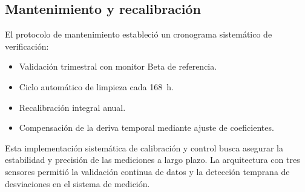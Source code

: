 \subsection{Mantenimiento y recalibración}
El protocolo de mantenimiento estableció un cronograma sistemático de verificación:
\begin{itemize}
	\item Validación trimestral con monitor Beta de referencia.
	\item Ciclo automático de limpieza cada \SI{168}{\hour}.
	\item Recalibración integral anual.
	\item Compensación de la deriva temporal mediante ajuste de coeficientes.
\end{itemize}

Esta implementación sistemática de calibración y control busca asegurar la estabilidad y precisión de las mediciones a largo plazo. La arquitectura con tres sensores permitió la validación continua de datos y la detección temprana de desviaciones en el sistema de medición.

% 
%
%
%
%
%
%
%
%
%	
%		
%
%		
%		
%		
%		



